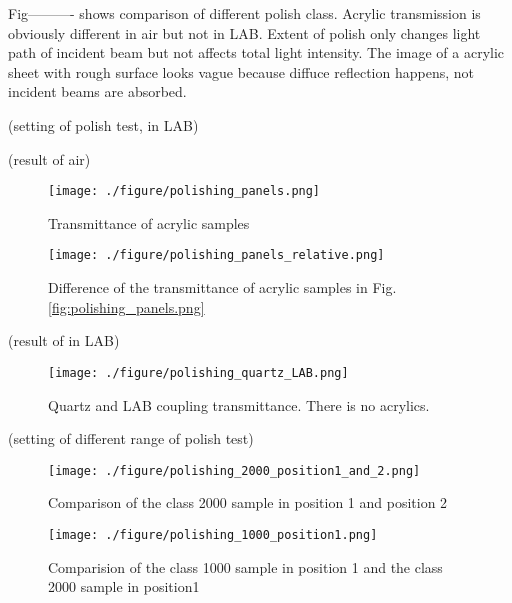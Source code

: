 Fig----------  shows comparison of different
polish class. Acrylic transmission is obviously different in air but not in LAB.
Extent of polish only changes light path of incident beam but not affects total light intensity.
The image of a acrylic sheet with rough surface looks vague because diffuce reflection happens, not
incident beams are absorbed.



(setting of polish test, in LAB)




(result of air)
\begin{figure}
    \centering
    \texttt{[image: ./figure/polishing\_panels.png]}
    \caption{Transmittance of acrylic samples}
    \label{polishing_panels.png}
    \end{figure}



\begin{figure}
    \centering
    \texttt{[image: ./figure/polishing\_panels\_relative.png]}
    \caption{Difference of the transmittance of acrylic samples in Fig. \ref{fig:polishing_panels.png}}
    \label{polishing_panels_relative.png}
    \end{figure}


(result of in LAB)
\begin{figure}
    \centering
    \texttt{[image: ./figure/polishing\_quartz\_LAB.png]}
    \caption{Quartz and LAB coupling transmittance. There is no acrylics.}
    \label{polishing_quartz_LAB.png}
    \end{figure}



(setting of different range of polish test)
\begin{figure}
    \centering
    \texttt{[image: ./figure/polishing\_2000\_position1\_and\_2.png]}
    \caption{Comparison of the class 2000 sample in position 1 and position 2}
    \label{polishing_2000_position1_and_2.png}
    \end{figure}



\begin{figure}
    \centering
    \texttt{[image: ./figure/polishing\_1000\_position1.png]}
    \caption{Comparision of the class 1000 sample in position 1 and the class 2000 sample in position1}
    \label{polishing_1000_position1.png}
    \end{figure}


